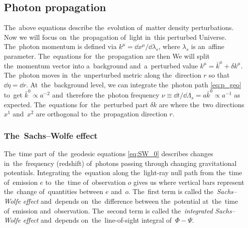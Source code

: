 \subsection{Photon propagation}
The~above equations describe the~evolution of~matter density perturbations. Now we will focus on~the~propagation of~light in~this perturbed Universe. The~photon momentum is defined via $k^\mu=\dd x^\mu/\dd\lambda_s$, where $\lambda_s$ is an~affine parameter. The~equations for~the~propagation are then
We will split the~momentum vector into a~background and~a~perturbed value $k^\mu=\bar k^\mu+\delta k^\mu$. The~photon moves in~the~unperturbed metric along the~direction $r$ so that $\dd\eta=\dd r$. At~the~background level, we can integrate the~photon path \eqref{eq:p_geo} to~get $\bar k^0\propto a^{-2}$ and~therefore the~photon frequency $\nu\equiv\dd t/\dd\Lambda_s=a\bar k^0\propto a^{-1}$ as expected. The~equations for~the~perturbed part $\delta k$ are \parencite[for~details see e.g. ][]{2010deto.book.....A}
where the~two directions $x^1$ and~$x^2$ are orthogonal to~the~propagation direction $r$.
\subsubsection{The~Sachs--Wolfe effect}
The~time part of~the~geodesic equations \eqref{eq:SW_0} describes changes in~the~frequency (redshift) of~photons passing through changing gravitational potentials. Integrating the~equation along the~light-ray null path from the~time of~emission $e$ to~the~time of~observation $o$ gives us
where vertical bars represent the~change of~quantities between $e$ and~$o$. The~first term is called the~\textit{Sachs--Wolfe effect} and~depends on~the~difference between the~potential at~the~time of~emission and~observation. The~second term is called the~\textit{integrated Sachs--Wolfe effect} and~depends on~the~line-of-sight integral of~$\Phi-\Psi$.
